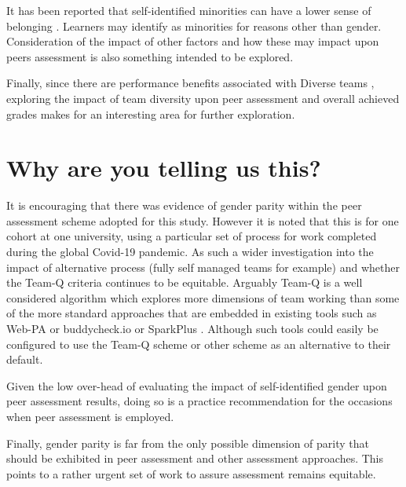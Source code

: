 \documentclass[sigconf, anonymous=true]{acmart}
\begin{document}
It has been reported that self-identified minorities can have a lower sense of belonging \cite{Mooney2020}. Learners may identify as minorities for reasons other than gender. Consideration of the impact of other factors and how these may impact upon peers assessment is also something intended to be explored.

Finally, since there are performance benefits associated with Diverse teams \cite{HBR206}, exploring the impact of team diversity upon peer assessment and overall achieved grades makes for an interesting area for further exploration.


\section{Why are you telling us this?}
It is encouraging that there was evidence of gender parity within the peer assessment scheme adopted for this study. However it is noted that this is for one cohort at one university, using a particular set of process for work completed during the global Covid-19 pandemic. As such a wider investigation into the impact of alternative process (fully self managed teams for example) and whether the Team-Q criteria continues to be equitable. Arguably Team-Q is a well considered algorithm which explores more dimensions of team working than some of the more standard approaches that are embedded in existing tools such as Web-PA \cite{WebPA} or buddycheck.io \cite{BuddyCheck} or SparkPlus \cite{SparkPlus}. Although such tools could easily be configured to use the Team-Q scheme or other scheme as an alternative to their default.

Given the low over-head of evaluating the impact of self-identified gender upon peer assessment results, doing so is a practice recommendation for the occasions when peer assessment is employed.

Finally, gender parity is far from the only possible dimension of parity that should be exhibited in peer assessment and other assessment approaches. This points to a rather urgent set of work to assure assessment remains equitable. 



\end{document}

